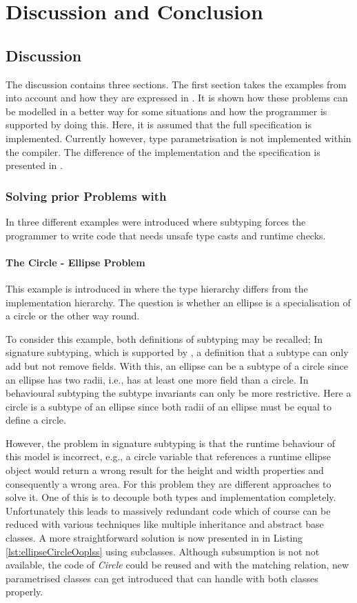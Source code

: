 
\chapter{Discussion and Conclusion}
\label{ctr:discussionConclusion}
\section{Discussion}
\label{ctr:discussion}
The discussion contains three sections. The first section takes the
examples from  into account and how
they are expressed in \ooplss. It is shown how these problems can be
modelled in a better way for some situations and how the programmer is
supported by doing this. Here, it is assumed that the full specification
is implemented. Currently however, type parametrisation is not implemented
within the compiler. The difference of the implementation and the
specification is presented in .

\subsection{Solving prior Problems with \ooplss}
In  three different examples were
introduced where subtyping forces the programmer to write code that
needs unsafe type casts and runtime checks.

\subsubsection{The Circle - Ellipse Problem}
This example is introduced in  where the type
hierarchy differs from the implementation hierarchy. The question is whether an ellipse
is a specialisation of a circle or the other way round.

To consider this example, both definitions of subtyping may be recalled;
In signature subtyping, which is supported by \ooplss, a
definition that a subtype can only add but not remove fields. With this,
an ellipse can be a subtype of a circle since an ellipse has two radii,
i.e., has at least one more field than a circle. In behavioural subtyping
the subtype invariants can only be more restrictive. Here a circle is
a subtype of an ellipse since both radii of an ellipse must be equal
to define a circle.

However, the problem in signature subtyping is that the runtime behaviour
of this model is incorrect, e.g., a circle variable that references a
runtime ellipse object would return a wrong result for the height and
width properties and consequently a wrong area. For this problem
they are different approaches to solve it. One of this is to
decouple both types and implementation completely. Unfortunately this
leads to massively redundant code which of course can be reduced with
various techniques like multiple inheritance and abstract base classes. A
more straightforward solution is now presented in \ooplss in Listing
\ref{lst:ellipseCircleOoplss} using subclasses. Although subsumption
is not not available, the code of \emph{Circle} could be reused and with the
matching relation, new parametrised classes can get introduced that can
handle with both classes properly.

